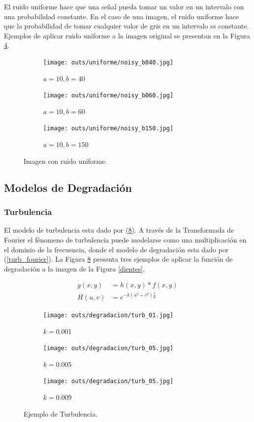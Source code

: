 \documentclass[
  letterpaper,
  twocolumn,
  9pt,
  journal,
  final]{IEEEtran}
\begin{document}
El ruido uniforme hace que una señal pueda tomar un valor en un intervalo con una probabilidad constante. En el caso de una imagen, el ruido uniforme hace que la probabilidad de tomar cualquier valor de gris en un intervalo es constante. Ejemplos de aplicar ruido uniforme a la imagen original se presentan en la Figura \ref{uniforme}.

\begin{figure}[!tbh]
  \centering
  \begin{subfigure}[b]{.32\linewidth}
    \texttt{[image: outs/uniforme/noisy\_b040.jpg]}
    \caption{$a=10, b=40$}\label{uni1}
  \end{subfigure}
  \begin{subfigure}[b]{.32\linewidth}
    \texttt{[image: outs/uniforme/noisy\_b060.jpg]}
    \caption{$a=10, b=60$}\label{uni2}
  \end{subfigure}
  \begin{subfigure}[b]{.32\linewidth}
    \texttt{[image: outs/uniforme/noisy\_b150.jpg]}
    \caption{$a=10, b=150$}\label{uni3}
  \end{subfigure}
  \caption{Imagen con ruido uniforme.}
  \label{uniforme}
\end{figure}

\subsection{Modelos de Degradación}

\subsubsection{Turbulencia}

El modelo de turbulencia esta dado por (\ref{turb}). A través de la Transformada de Fourier el fénomeno de turbulencia puede modelarse como una multiplicación en el dominio de la frecuencia, donde el modelo de degradación esta dado por (\ref{turb_fourier}). La Figura \ref{turb} presenta tres ejemplos de aplicar la función de degradación a la imagen de la Figura \ref{dientes}.

\begin{align}
  g(x, y) &= h(x,y) * f(x,y) \label{turb} \\
  H(u,v) &= e ^ {-k (u^2 + v^2) \frac{5}{6}} \label{turb_fourier}
\end{align}

\begin{figure}[!tbh]
  \centering
  \begin{subfigure}[b]{.32\linewidth}
    \texttt{[image: outs/degradacion/turb\_01.jpg]}
    \caption{$k=0.001$}\label{turb1}
  \end{subfigure}
  \begin{subfigure}[b]{.32\linewidth}
    \texttt{[image: outs/degradacion/turb\_05.jpg]}
    \caption{$k=0.005$}\label{turb5}
  \end{subfigure}
  \begin{subfigure}[b]{.32\linewidth}
    \texttt{[image: outs/degradacion/turb\_05.jpg]}
    \caption{$k=0.009$}\label{turb9}
  \end{subfigure}
  \caption{Ejemplo de Turbulencia.}
  \label{turb}
\end{figure}
\end{document}
